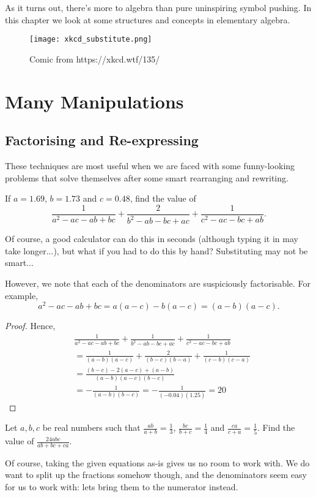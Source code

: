 \documentclass[../jarvis.tex]{subfiles}
\begin{document}
As it turns out, there's more to algebra than pure uninspiring symbol pushing. In this chapter we look at some structures and concepts in elementary algebra.

\begin{figure}[H]
    \centering
    \texttt{[image: xkcd\_substitute.png]}
    \caption{Comic from https://xkcd.wtf/135/}
\end{figure}

\section{Many Manipulations}
\subsection{Factorising and Re-expressing}
These techniques are most useful when we are faced with some funny-looking problems that solve themselves after some smart rearranging and rewriting.

\begin{example}[2013 SMO(J) P15]
    If $a=1.69$, $b=1.73$ and $c=0.48$, find the value of
    $$\frac{1}{a^2-ac-ab+bc}+\frac{2}{b^2-ab-bc+ac}+\frac{1}{c^2-ac-bc+ab}.$$
\end{example}
Of course, a good calculator can do this in seconds (although typing it in may take longer...), but what if you had to do this by hand? Substituting may not be smart...

However, we note that each of the denominators are suspiciously factorisable. For example,
$$a^2-ac-ab+bc=a(a-c)-b(a-c)=(a-b)(a-c).$$

\begin{proof}
    Hence,
\begin{align*}
    & \frac{1}{a^2-ac-ab+bc}+\frac{1}{b^2-ab-bc+ac}+\frac{1}{c^2-ac-bc+ab}\\
    &=\frac{1}{(a-b)(a-c)}+\frac{2}{(b-c)(b-a)}+\frac{1}{(c-b)(c-a)} \\
    &=\frac{(b-c)-2(a-c)+(a-b)}{(a-b)(a-c)(b-c)} \\
    &=-\frac{1}{(a-b)(b-c)} = -\frac{1}{(-0.04)(1.25)} = \boxed{20}
\end{align*}
\end{proof}

\begin{example}[2013 SMO(J) P20]
    Let $a,b,c$ be real numbers such that $\frac{ab}{a+b}=\frac{1}{3}$, $\frac{bc}{b+c}=\frac{1}{4}$ and $\frac{ca}{c+a}=\frac{1}{5}$. Find the value of $\frac{24abc}{ab+bc+ca}$.
\end{example}
Of course, taking the given equations as-is gives us no room to work with. We do want to split up the fractions somehow though, and the denominators seem easy for us to work with: lets bring them to the numerator instead.
\end{document}
